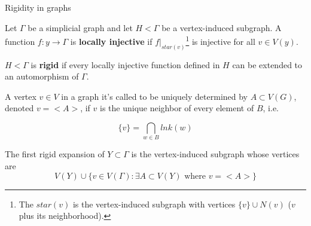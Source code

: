 \documentclass[handout]{beamer}
\theoremstyle{plain}
\begin{document}
\begin{frame}{Rigidity in graphs}
    \begin{definition}
Let $\Gamma$ be a simplicial graph and let $H<\Gamma$ be a vertex-induced subgraph. A function $f:y\to \Gamma$ is \textbf{locally injective} if $f|_{star(v)}$\footnote{The $star(v)$ is the vertex-induced subgraph with vertices $\{ v \} \cup N(v)$ ($v$ plus its neighborhood).} is injective for all $v \in V(y)$. 
\end{definition}

\begin{definition}
$H<\Gamma$ is \textbf{rigid} if every locally injective function defined in $H$ can be extended to an automorphism of $\Gamma$. 
\end{definition}
\end{frame}

\begin{frame}
A vertex $v \in V$ in a graph it's called to be uniquely determined by $A\subset V(G)$, denoted $v=<A>$, if $v$ is the unique neighbor of every element of $B$, i.e.

$$ \{ v \} = \bigcap_{w\in B} lnk(w) $$

\begin{definition}
The first rigid expansion of $Y\subset \Gamma$ is the vertex-induced subgraph whose vertices are
$$ V(Y) \cup \{ v\in V(\Gamma) :  \exists A \subset V(Y) \text{ where } v = <A>  \}$$
\end{definition}

\end{frame}



\end{document}
